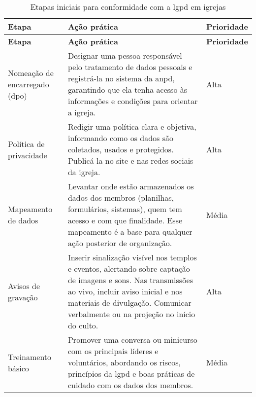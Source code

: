 \begin{longtable}{>{\raggedright\arraybackslash}p{4cm} >{\raggedright\arraybackslash}p{10cm} p{2cm}}
\caption{Etapas iniciais para conformidade com a \gls{lgpd} em igrejas}
\label{tab:etapas-lgpd-igreja} \\
\toprule
\textbf{Etapa} & \textbf{Ação prática} & \textbf{Prioridade} \\
\midrule
\endfirsthead

\toprule
\textbf{Etapa} & \textbf{Ação prática} & \textbf{Prioridade} \\
\midrule
\endhead

\bottomrule
\endfoot

Nomeação de encarregado (\gls{dpo})\tnote{a} & Designar uma pessoa responsável pelo tratamento de dados pessoais e registrá-la no sistema da \gls{anpd}, garantindo que ela tenha acesso às informações e condições para orientar a igreja. & Alta \\
Política de privacidade & Redigir uma política clara e objetiva, informando como os dados são coletados, usados e protegidos. Publicá-la no site e nas redes sociais da igreja. & Alta \\
Mapeamento de dados & Levantar onde estão armazenados os dados dos membros (planilhas, formulários, sistemas), quem tem acesso e com que finalidade. Esse mapeamento é a base para qualquer ação posterior de organização. & Média \\
Avisos de gravação & Inserir sinalização visível nos templos e eventos, alertando sobre captação de imagens e sons. Nas transmissões ao vivo, incluir aviso inicial e nos materiais de divulgação. Comunicar verbalmente ou na projeção no início do culto. & Alta \\
Treinamento básico & Promover uma conversa ou minicurso com os principais líderes e voluntários, abordando os riscos, princípios da \gls{lgpd} e boas práticas de cuidado com os dados dos membros. & Média \\
\end{longtable}
